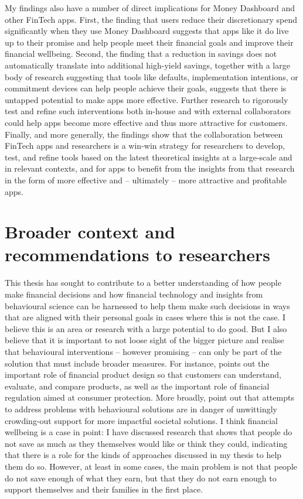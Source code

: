 My findings also have a number of direct implications for Money Dashboard and
other FinTech apps. First, the finding that users reduce their discretionary
spend significantly when they use Money Dashboard suggests that apps like it do
live up to their promise and help people meet their financial goals and improve
their financial wellbeing. Second, the finding that a reduction in savings does
not automatically translate into additional high-yield savings, together with a
large body of research suggesting that tools like defaults, implementation
intentions, or commitment devices can help people achieve their goals, suggests
that there is untapped potential to make apps more effective. Further research
to rigorously test and refine such interventions both in-house and with
external collaborators could help apps become more effective and thus more
attractive for customers. Finally, and more generally, the findings show that
the collaboration between FinTech apps and researchers is a win-win strategy
for researchers to develop, test, and refine tools based on the latest
theoretical insights at a large-scale and in relevant contexts, and for
apps to benefit from the insights from that research in the form of more
effective and -- ultimately -- more attractive and profitable apps. 

\section{Broader context and recommendations to researchers}

This thesis has sought to contribute to a better understanding of how people make financial decisions and how financial technology and insights from behavioural science can be harnessed to help them make such decisions in ways that are aligned with their personal goals in cases where this is not the case. I believe this is an area or research with a large potential to do good. But I also believe that it is
important to not loose sight of the bigger picture and realise that
behavioural interventions -- however promising -- can only be part of the
solution that must include broader measures. For instance,
\citet{agarwal2017shapes} points out the important role of financial product
design so that customers can understand, evaluate, and compare products, as
well as the important role of financial regulation aimed at consumer
protection. More broadly, \citet{chater2022frame} point out that attempts to
address problems with behavioural solutions are in danger of unwittingly
crowding-out support for more impactful societal solutions. I think financial
wellbeing is a case in point: I have discussed research that shows that people
do not save as much as they themselves would like or think they could, indicating that there is a role for
the kinds of approaches discussed in my thesis to help them do so. However, at
least in some cases, the main problem is not that people do not save
enough of what they earn, but that they do not earn enough to support
themselves and their families in the first place.

